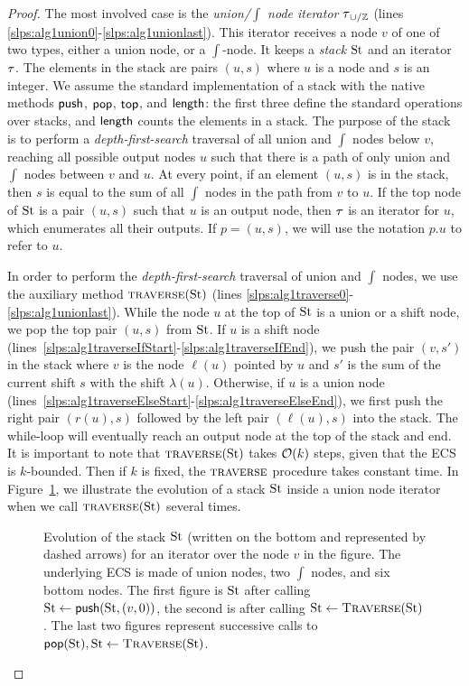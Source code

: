 \begin{proof}
	The most involved case is the \emph{union/$\int$ node iterator} $\operatorname{\tau}_{\cup/\mathbb{Z}}$ (lines \ref{slps:alg1union0}-\ref{slps:alg1unionlast}). 
	This iterator receives a node $v$ of one of two types, either a union node, or a $\int$-node. It keeps a \emph{stack} $\operatorname{St}$ and an iterator~$\operatorname{\tau}$. The elements in the stack are pairs $(u, s)$ where $u$ is a node and $s$ is an integer. We assume the standard implementation of a stack with the native methods $\text{\sf push}$, $\text{\sf pop}$, $\text{\sf top}$, and $\text{\sf length}$: the first three define the standard operations over stacks, and $\text{\sf length}$ counts the elements in a stack. 
	The purpose of the stack is to perform a \emph{depth-first-search} traversal of all union and $\int$ nodes below $v$, reaching all possible output nodes $u$ such that there is a path of only union and $\int$ nodes between $v$ and $u$. At every point, if an element $(u,s)$ is in the stack, then $s$ is equal to the sum of all $\int$ nodes in the path from $v$ to $u$. If the top node of $\operatorname{St}$ is a pair $(u, s)$ such that $u$ is an output node, then $\operatorname{\tau}$ is an iterator for $u$, which enumerates all their outputs. If $p = (u,s)$, we will use the notation $p.u$ to refer to $u$.
	
	In order to perform the \emph{depth-first-search} traversal of union and $\int$ nodes, we use the auxiliary method $\textsc{traverse}(\operatorname{St})$ (lines \ref{slps:alg1traverse0}-\ref{slps:alg1unionlast}). While the node $u$ at the top of $\operatorname{St}$ is a union or a shift node, we pop the top pair $(u,s)$ from $\operatorname{St}$. If $u$ is a shift node (lines~\ref{slps:alg1traverseIfStart}-\ref{slps:alg1traverseIfEnd}), we push the pair $(v, s')$ in the stack where $v$ is the node $\ell(u)$ pointed by $u$ and $s'$ is the sum of the current shift $s$ with the shift $\lambda(u)$.
	Otherwise, if $u$ is a union node (lines~\ref{slps:alg1traverseElseStart}-\ref{slps:alg1traverseElseEnd}), we first push the right pair $(r(u), s)$ followed by the left pair $(\ell(u), s)$ into the stack. 	
	The while-loop will eventually reach an output node at the top of the stack and end. 
	It is important to note that $\textsc{traverse}(\operatorname{St})$ takes $\mathcal{O}(k)$ steps, given that the ECS is $k$-bounded. Then if $k$ is fixed, the  $\textsc{traverse}$ procedure takes constant time. In Figure~\ref{slps:fig-enum-stacks}, we illustrate the evolution of a stack $\operatorname{St}$ inside a union node iterator when we call $\textsc{traverse}(\operatorname{St})$ several times. 
	\begin{figure}[t]
		\centering
		
		\caption{Evolution of the stack $\operatorname{St}$ (written on the bottom and represented by dashed arrows) for an iterator over the node $v$ in the figure. 
		The underlying ECS is made of union nodes, two $\int$ nodes, and six bottom nodes. The first figure is $\operatorname{St}$ after calling $\operatorname{St} \gets {\sf push}(\operatorname{St}, (v,0))$, the second is after calling $\operatorname{St} \gets\textsc{Traverse}(\operatorname{St})$. The last two figures represent successive calls to ${\sf pop}(\operatorname{St}), \operatorname{St} \gets\textsc{Traverse}(\operatorname{St})$.}
		\label{slps:fig-enum-stacks}
	\end{figure}
	

\end{proof}
